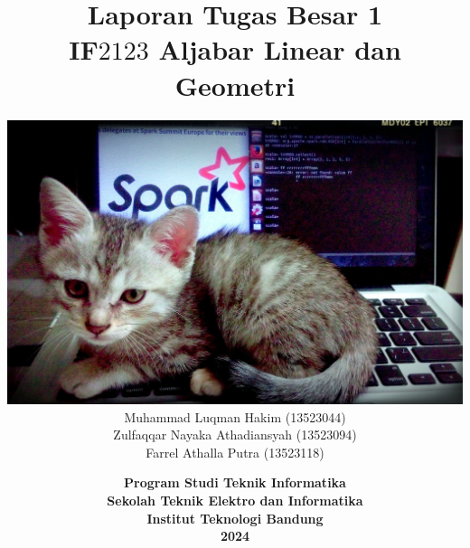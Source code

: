 \title{
\textbf{Laporan Tugas Besar 1} 
\\ IF$2123$ Aljabar Linear dan Geometri \\[5em]
}

\author{
{\centering\includegraphics[scale=0.1]{cat.jpg} } \\[1em]
Muhammad Luqman Hakim (13523044) \\ 
Zulfaqqar Nayaka Athadiansyah (13523094) \\ 
Farrel Athalla Putra (13523118) \\[5em]}

\date{\textbf{Program Studi Teknik Informatika \\
Sekolah Teknik Elektro dan Informatika \\
Institut Teknologi Bandung \\
2024}}